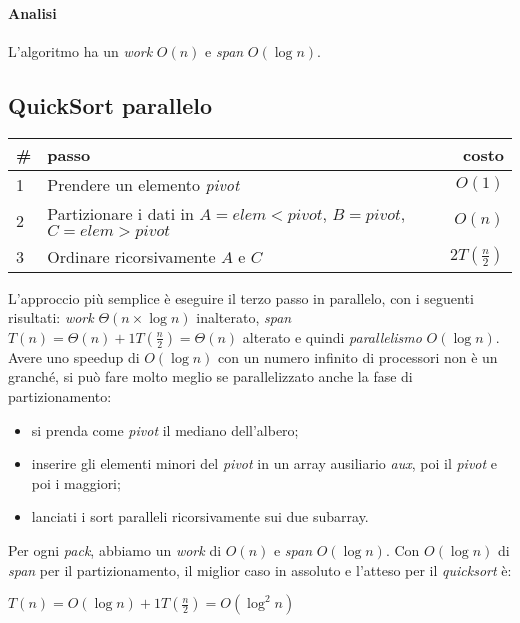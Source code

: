 \paragraph{Analisi}
L'algoritmo ha un \textit{work} $O(n)$ e \textit{span} $O(\log{n})$.

\subsection{QuickSort parallelo}
\begin{center}
	\begin{tabular}{| l | l | r |}
		\hline
		\textbf{\#} & \textbf{passo} & \textbf{costo} \\ \hline
		1 & Prendere un elemento \textit{pivot} & $O(1)$ \\
		2 & Partizionare i dati in $A = elem < pivot$, $B = pivot$, $C = elem > pivot$ & $O(n)$ \\
		3 & Ordinare ricorsivamente $A$ e $C$ & $2T(\frac{n}{2})$ \\
		\hline
	\end{tabular}
\end{center}
L'approccio più semplice è eseguire il terzo passo in parallelo, con i seguenti risultati: \textit{work} $\Theta(n\times \log{n})$ inalterato, \textit{span} $T(n) = \Theta(n) + 1T(\frac{n}{2}) = \Theta(n)$ alterato e quindi \textit{parallelismo} $O(\log{n})$. \\
Avere uno speedup di $O(\log{n})$ con un numero infinito di processori non è un granché, si può fare molto meglio se parallelizzato anche la fase di partizionamento:
\begin{itemize}
	\item si prenda come \textit{pivot} il mediano dell'albero;
	\item inserire gli elementi minori del \textit{pivot} in un array ausiliario \textit{aux}, poi il \textit{pivot} e poi i maggiori;
	\item lanciati i sort paralleli ricorsivamente sui due subarray.
\end{itemize}
Per ogni \textit{pack}, abbiamo un \textit{work} di $O(n)$ e \textit{span} $O(\log{n})$. Con $O(\log{n})$ di \textit{span} per il partizionamento, il miglior caso in assoluto e l'atteso per il \textit{quicksort} è:
\begin{center}
	$T(n) = O(\log{n}) + 1T(\frac{n}{2}) = O(\log^{2}{n})$
\end{center}

